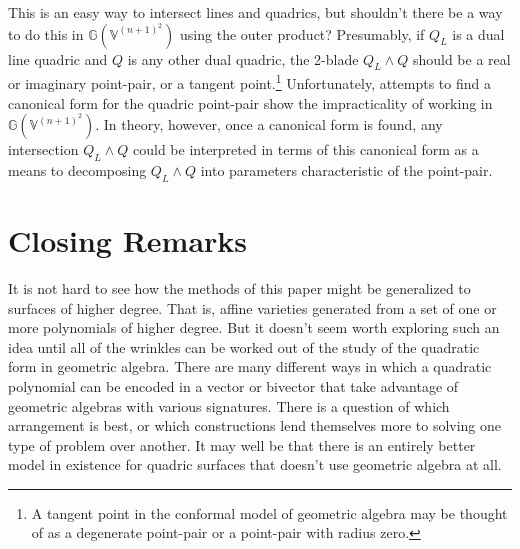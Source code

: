 \documentclass{birkjour}
\theoremstyle{definition}
\theoremstyle{remark}
\numberwithin{equation}{section}
\newcommand{\G}{\mathbb{G}}
\newcommand{\V}{\mathbb{V}}
\begin{document}
This is an easy way to intersect lines and quadrics, but shouldn't there be
a way to do this in $\G(\V^{(n+1)^2})$ using the outer product?  Presumably,
if $Q_L$ is a dual line quadric and $Q$ is any other dual quadric, the 2-blade
$Q_L\wedge Q$ should be a real or imaginary point-pair, or a tangent point.\footnote{A
tangent point in the conformal model of geometric algebra may be thought of as a
degenerate point-pair or a point-pair with radius zero.}
Unfortunately, attempts to find a canonical form for the quadric point-pair
show the impracticality of working in $\G(\V^{(n+1)^2})$.  In theory, however,
once a canonical form is found, any intersection $Q_L\wedge Q$ could
be interpreted in terms of this canonical form as a means to decomposing $Q_L\wedge Q$
into parameters characteristic of the point-pair.

\section{Closing Remarks}

It is not hard to see how the methods of this paper might be generalized
to surfaces of higher degree.  That is, affine varieties generated from a
set of one or more polynomials of higher degree.  But it doesn't seem worth
exploring such an idea until all of the wrinkles can be worked out of the study
of the quadratic form in geometric algebra.  There are many different ways
in which a quadratic polynomial can be encoded in a vector or bivector that
take advantage of geometric algebras with various signatures.  There is a question
of which arrangement is best, or which constructions lend themselves more to solving
one type of problem over another.  It may well be that there is an entirely
better model in existence for quadric surfaces that doesn't use geometric algebra at all.







\end{document}

